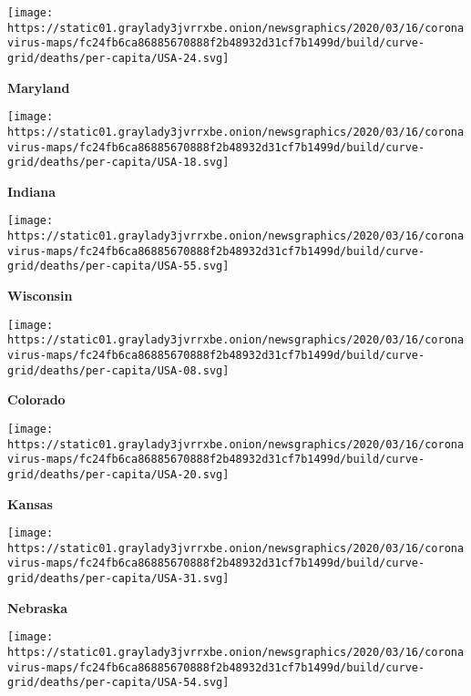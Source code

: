 \texttt{[image: https://static01.graylady3jvrrxbe.onion/newsgraphics/2020/03/16/coronavirus-maps/fc24fb6ca86885670888f2b48932d31cf7b1499d/build/curve-grid/deaths/per-capita/USA-24.svg]}

\textbf{Maryland}

\href{https://www.nytimes3xbfgragh.onion/interactive/2020/us/indiana-coronavirus-cases.html}{}

\texttt{[image: https://static01.graylady3jvrrxbe.onion/newsgraphics/2020/03/16/coronavirus-maps/fc24fb6ca86885670888f2b48932d31cf7b1499d/build/curve-grid/deaths/per-capita/USA-18.svg]}

\textbf{Indiana}

\href{https://www.nytimes3xbfgragh.onion/interactive/2020/us/wisconsin-coronavirus-cases.html}{}

\texttt{[image: https://static01.graylady3jvrrxbe.onion/newsgraphics/2020/03/16/coronavirus-maps/fc24fb6ca86885670888f2b48932d31cf7b1499d/build/curve-grid/deaths/per-capita/USA-55.svg]}

\textbf{Wisconsin}

\href{https://www.nytimes3xbfgragh.onion/interactive/2020/us/colorado-coronavirus-cases.html}{}

\texttt{[image: https://static01.graylady3jvrrxbe.onion/newsgraphics/2020/03/16/coronavirus-maps/fc24fb6ca86885670888f2b48932d31cf7b1499d/build/curve-grid/deaths/per-capita/USA-08.svg]}

\textbf{Colorado}

\href{https://www.nytimes3xbfgragh.onion/interactive/2020/us/kansas-coronavirus-cases.html}{}

\texttt{[image: https://static01.graylady3jvrrxbe.onion/newsgraphics/2020/03/16/coronavirus-maps/fc24fb6ca86885670888f2b48932d31cf7b1499d/build/curve-grid/deaths/per-capita/USA-20.svg]}

\textbf{Kansas}

\href{https://www.nytimes3xbfgragh.onion/interactive/2020/us/nebraska-coronavirus-cases.html}{}

\texttt{[image: https://static01.graylady3jvrrxbe.onion/newsgraphics/2020/03/16/coronavirus-maps/fc24fb6ca86885670888f2b48932d31cf7b1499d/build/curve-grid/deaths/per-capita/USA-31.svg]}

\textbf{Nebraska}

\href{https://www.nytimes3xbfgragh.onion/interactive/2020/us/west-virginia-coronavirus-cases.html}{}

\texttt{[image: https://static01.graylady3jvrrxbe.onion/newsgraphics/2020/03/16/coronavirus-maps/fc24fb6ca86885670888f2b48932d31cf7b1499d/build/curve-grid/deaths/per-capita/USA-54.svg]}


